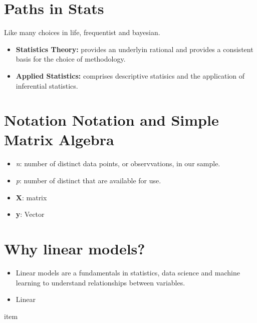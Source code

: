 \documentclass[10pt, oneside]{article}
\begin{document}
\section{Paths in Stats}
Like many choices in life, frequentist and bayesian.
\begin{itemize}
	\item \textbf{Statistics Theory:} provides an underlyin rational and provides a consistent basis for the choice of methodology.
	\item \textbf{Applied Statistics:} comprises descriptive statisics and the application of inferential statistics.
\end{itemize}

\section{Notation Notation and Simple Matrix Algebra}

\begin{itemize}
	\item \textit{n}: number of distinct data points, or observvations, in our sample.
	\item \textit{p}: number of distinct that are available for use.
	\item \textbf{X}: matrix
	\item \textbf{y}: Vector
\end{itemize}

\section{Why linear models?}
\begin{itemize}
	\item Linear models are a fundamentals in statistics, data science and machine learning to understand relationships
	      between variables.
	\item Linear
\end{itemize}item
\end{document}
